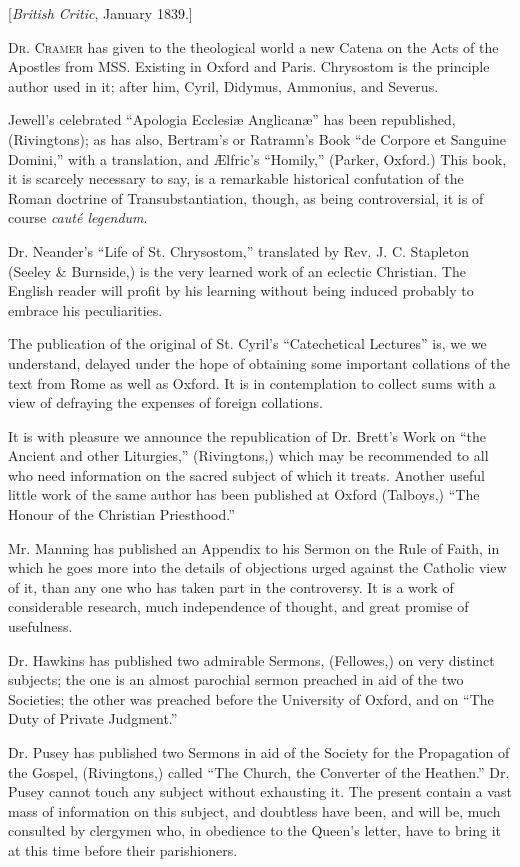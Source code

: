 
[\emph{British Critic}, January 1839.]

D\textsc{r}. C\textsc{ramer}
has given to the theological world a new Catena on the Acts of the
Apostles from MSS. Existing in Oxford and Paris. Chrysostom is the
principle author used in it; after him, Cyril, Didymus, Ammonius, and
Severus.

Jewell's celebrated ``Apologia Ecclesiæ Anglicanæ''
has been republished, (Rivingtons); as has also, Bertram's or Ratramn's
Book ``de Corpore et Sanguine Domini,'' with a translation, and Ælfric's ``Homily,''
(Parker, Oxford.) This book, it is scarcely necessary to say, is a
remarkable historical confutation of the Roman doctrine of
Transubstantiation, though, as being controversial, it is of course \emph{cauté
legendum}.

Dr. Neander's ``Life of St. Chrysostom,'' translated
by Rev. J. C. Stapleton (Seeley \& Burnside,) is the very learned
work of an eclectic Christian. The English reader will profit by his
learning without being induced probably to embrace his peculiarities.

The publication of the original of St. Cyril's ``Catechetical
Lectures'' is, we we understand, delayed under the hope of obtaining some
important collations of the text from Rome as well as Oxford. It is in
contemplation to collect sums with a view of defraying the expenses of
foreign collations.

It is with pleasure we announce the republication
of Dr. Brett's Work on ``the Ancient and other Liturgies,'' (Rivingtons,)
which may be recommended to all who need information on the sacred
subject of which it treats. Another useful little work of the same
author has been published at Oxford (Talboys,) ``The Honour of the
Christian Priesthood.''

Mr. Manning has published an Appendix to his Sermon
on the Rule of Faith, in which he goes more into the details of
objections urged against the Catholic view of it, than any one who has
taken part in the controversy. It is a work of considerable research,
much independence of thought, and great promise of usefulness.

Dr. Hawkins has published two admirable Sermons, (Fellowes,) on
very distinct subjects; the one is an almost parochial sermon preached
in aid of the two Societies; the other was preached before the
University of Oxford, and on ``The Duty of Private Judgment.''

Dr. Pusey has published two Sermons in aid of the
Society for the Propagation of the Gospel, (Rivingtons,) called ``The
Church, the Converter of the Heathen.'' Dr. Pusey cannot touch any
subject without exhausting it. The present contain a vast mass of
information on this subject, and doubtless have been, and will be, much
consulted by clergymen who, in obedience to the Queen's letter, have to
bring it at this time before their parishioners.

